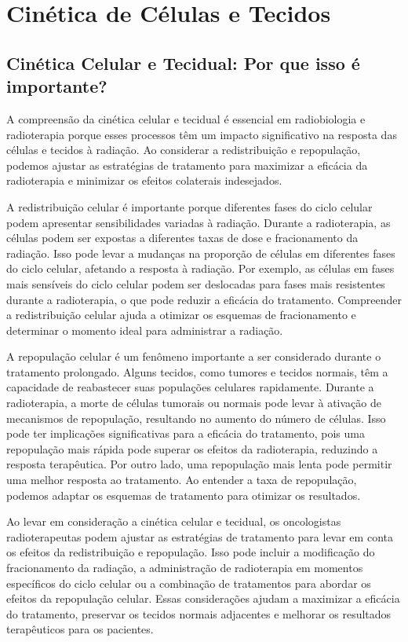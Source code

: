 \documentclass[11pt,a4paper]{article}
\newcounter{exemplo}
\begin{document}
\section{Cinética de Células e Tecidos}

\subsection*{Cinética Celular e Tecidual: Por que isso é importante?}

	A compreensão da cinética celular e tecidual é essencial em radiobiologia e radioterapia porque esses processos têm um impacto significativo na resposta das células e tecidos à radiação. Ao considerar a redistribuição e repopulação, podemos ajustar as estratégias de tratamento para maximizar a eficácia da radioterapia e minimizar os efeitos colaterais indesejados.

	A redistribuição celular é importante porque diferentes fases do ciclo celular podem apresentar sensibilidades variadas à radiação. Durante a radioterapia, as células podem ser expostas a diferentes taxas de dose e fracionamento da radiação. Isso pode levar a mudanças na proporção de células em diferentes fases do ciclo celular, afetando a resposta à radiação. Por exemplo, as células em fases mais sensíveis do ciclo celular podem ser deslocadas para fases mais resistentes durante a radioterapia, o que pode reduzir a eficácia do tratamento. Compreender a redistribuição celular ajuda a otimizar os esquemas de fracionamento e determinar o momento ideal para administrar a radiação.

	A repopulação celular é um fenômeno importante a ser considerado durante o tratamento prolongado. Alguns tecidos, como tumores e tecidos normais, têm a capacidade de reabastecer suas populações celulares rapidamente. Durante a radioterapia, a morte de células tumorais ou normais pode levar à ativação de mecanismos de repopulação, resultando no aumento do número de células. Isso pode ter implicações significativas para a eficácia do tratamento, pois uma repopulação mais rápida pode superar os efeitos da radioterapia, reduzindo a resposta terapêutica. Por outro lado, uma repopulação mais lenta pode permitir uma melhor resposta ao tratamento. Ao entender a taxa de repopulação, podemos adaptar os esquemas de tratamento para otimizar os resultados.

	Ao levar em consideração a cinética celular e tecidual, os oncologistas radioterapeutas podem ajustar as estratégias de tratamento para levar em conta os efeitos da redistribuição e repopulação. Isso pode incluir a modificação do fracionamento da radiação, a administração de radioterapia em momentos específicos do ciclo celular ou a combinação de tratamentos para abordar os efeitos da repopulação celular. Essas considerações ajudam a maximizar a eficácia do tratamento, preservar os tecidos normais adjacentes e melhorar os resultados terapêuticos para os pacientes.
\end{document}
